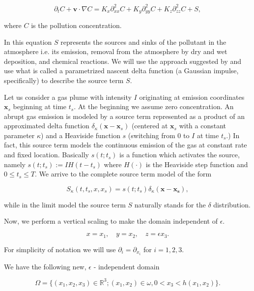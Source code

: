 \documentclass[11pt]{article}
\begin{document}
\begin{equation} \label{diffusive}
  \partial_t C + \mathbf{v} \cdot \nabla C = K_x \partial_{xx} ^2 C + K_y  \partial_{yy} ^2  C + K_z  \partial_{zz} ^2  C + S,
\end{equation}

where $C$ is the pollution concentration.

In this equation $S$ represents the sources and sinks of the pollutant in the atmosphere i.e. its emission, removal from the atmosphere by dry and wet deposition, and chemical reactions. We will use the approach suggested by \cite{zhuk2016source} and use what is called a parametrized nascent delta function (a Gaussian impulse, specifically) to describe the source term $S$.

Let us consider a gas plume with intensity $I$ originating at emission coordinates $\mathbf{x}_s$ beginning at time $t_s$. At the beginning we assume zero concentration.
An abrupt gas emission is modeled by a source term represented as a product of an approximated delta function $\delta_\kappa (\mathbf{x} - \mathbf{x}_s)$ (centered at $\mathbf{x}_s$ with a constant parameter $\kappa$) and a Heaviside function $s$ (switching from 0 to $I$ at time $t_s.$)
In fact, this source term models the continuous emission of the gas at constant rate and fixed location.
Basically $s(t;t_s)$ is a function which activates the source, namely $s(t;t_s) := IH(t - t_s)$ where $H(\cdot)$ is the Heaviside step function and $0 \leq t_s \leq T.$ We arrive to the complete source term model of the form

\begin{equation} \label{approxsourceterm}
  S_\kappa (t, t_s, x, x_s) = s(t; t_s) \delta_\kappa (\mathbf{x} - \mathbf{x_s}),
\end{equation}

while in the limit model the source term $S$ naturally stands for the $\delta$ distribution.
    
Now, we perform a vertical scaling to make the domain independent of $\epsilon.$

    \[x=x_1, \quad y=x_2, \quad z=\epsilon x_3. \]
    
    For simplicity of notation we will use $\partial_i = \partial_{x_i} $ for $i = 1,2,3.$
    
    We have the following new, $\epsilon$ - independent domain
    
    \[ \Omega =  \{(x_1,x_2,x_3) \in \mathbb{R}^3 ; (x_1,x_2) \in \omega, 0 < x_3 < h (x_1 , x_2) \}.\]
    
\end{document}
